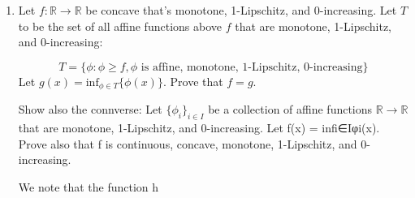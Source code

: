 \documentclass{article}
\newcommand{\chapternumber}{1}
\newenvironment{QandA}{\begin{enumerate}[label=\chapternumber.\arabic*]\bfseries\boldmath}
	{\end{enumerate}}
\newenvironment{answered}{\par\bigskip\normalfont\unboldmath}{}
\begin{document}
\begin{QandA}
		\[T = \{\phi : \phi \geq f,\phi \text{ is affine}\}\]
		Let $g(x) = \text{inf}_{\phi\in T} \{\phi(x)\}$. Prove that $f = g$.
		\begin{answered}
			Intuitively, this is just the statement that a concave function lies below all its tangents. But $f$ need not actually be differentiable, so might not have a tangent at every given point. We resolve this with the following construction:
			\\\\
			Take an arbitrary real point $x$. Consider arbitrary reals $a$,$b$ s.t. $a<x<b$. Then $p=\frac{b-x}{b-a}$ is s.t. $x=pa+(1-p)b$. By concavity of $f$
			\[f(x) \geq pf(a)+(1-p)f(b)=\frac{b-x}{b-a}f(a)+\frac{x-a}{b-a}f(b)\]
			Rearranging gives
			\[\frac{f(x)-f(a)}{x-a}\geq\frac{f(b)-f(x)}{b-x}\]
		$a$,$b$ were arbitrary, with the only condition being $a<x<b$. Therefore the following expressions:
		\[A=\inf_{a<x}\frac{f(x)-f(a)}{x-a}\]
		\[B=\sup_{b>x}\frac{f(b)-f(a)}{b-x}\]
		are both finite, with $B\leq A$. 
		Now we note that the function $h(y) = A(y-x)+f(x)$ is affine via our result from question 1.1. We also note that $h(x)=f(x)$. $\forall a<x$ we have
		\[h(a)=A(a-x)+f(x)\geq\frac{f(x)-f(a)}{x-a}(a-x)+f(x)=f(a)\]
		(The inequality follows from the definition of $A$ and the sign of $a-x$). A similar logic using the definition of $B$ and the fact that $A\geq B$ shows us that $h\geq f$ everywhere. Therefore $h\in T$ and $g(x)<=h(x)=f(x)$. By definition of $T$, we must also have $g(x)\geq f(x)$, and so $g(x)=f(x)$. $x$ was arbitrary, so therefore $f=g$.
		
		
		\end{answered}
		\newpage
	
		\item Let $f : \mathbb{R} \rightarrow \mathbb{R}$ be concave that’s monotone, 1-Lipschitz, and
		0-increasing. Let $T$ to be the set of
		all affine functions above $f$ that are monotone, 1-Lipschitz, and
		0-increasing:
		
		\[T = \{\phi : \phi \geq f,\phi \text{ is affine, monotone, 1-Lipschitz, 0-increasing}\}\]
		Let $g(x) = \text{inf}_{\phi\in T} \{\phi(x)\}$. Prove that $f = g$.
		
		Show also the connverse: Let $\{\phi_i\}_{i\in I}$ be a collection of affine functions $\mathbb{R} → \mathbb{R}$ that are monotone,
		1-Lipschitz, and 0-increasing. Let f(x) = infi∈Iφi(x). Prove also that f is
		continuous, concave, monotone, 1-Lipschitz, and 0-increasing.
		\begin{answered}
			We note that the function h 
			
			
		\end{answered}
	
		\end{QandA}
\end{document}
